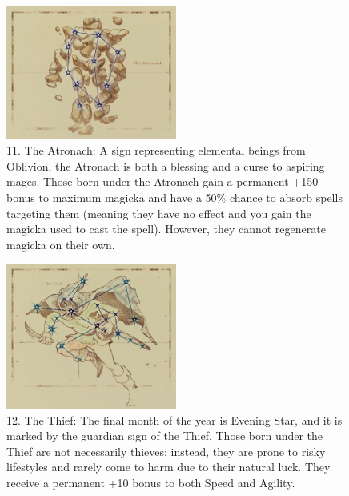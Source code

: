 \documentclass[12pt]{book}
\begin{document}
\begin{figure}[H]
\includegraphics[width=0.5\textwidth]{Atronach.png}
\centering
\caption*{11. The Atronach: A sign representing elemental beings from Oblivion, the Atronach is both a blessing and a curse to aspiring mages. Those born under the Atronach gain a permanent +150 bonus to maximum magicka and have a 50\% chance to absorb spells targeting them (meaning they have no effect and you gain the magicka used to cast the spell). However, they cannot regenerate magicka on their own.}
\end{figure}

\begin{figure}[H]
\includegraphics[width=0.5\textwidth]{Thief.png}
\centering
\caption*{12. The Thief: The final month of the year is Evening Star, and it is marked by the guardian sign of the Thief. Those born under the Thief are not necessarily thieves; instead, they are prone to risky lifestyles and rarely come to harm due to their natural luck. They receive a permanent +10 bonus to both Speed and Agility.}
\end{figure}
\end{document}
